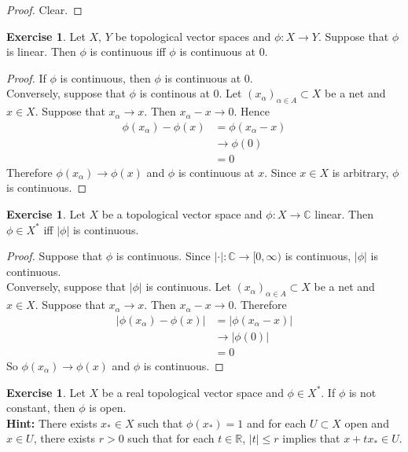 \documentclass[12pt]{amsart}
\theoremstyle{definition}
\newtheorem{ex}[definition]{Exercise}
\newcommand{\al}{\alpha}
\newcommand{\C}{\mathbb{C}}
\newcommand{\R}{\mathbb{R}}
\newcommand{\Rg}{[0,\infty)}
\begin{document}
	\begin{proof}
		Clear.
	\end{proof}

	\begin{ex}
		Let $X$, $Y$ be topological vector spaces and $\phi:X \rightarrow Y$. Suppose that $\phi$ is linear. Then $\phi$ is continuous iff $\phi$ is continuous at $0$.
	\end{ex}
	
	\begin{proof}
		If $\phi$ is continuous, then $\phi$ is continuous at $0$.\\
		Conversely, suppose that $\phi$ is continous at $0$. Let $(x_{\al})_{\al \in A} \subset X$ be a net and $x \in X$. Suppose that $x_{\al} \rightarrow x$. Then $x_{\al} - x \rightarrow 0$. Hence 
		\begin{align*}
			\phi(x_{\al}) - \phi(x) 
			&= \phi(x_{\al} - x) \\
			&\rightarrow \phi(0) \\
			&= 0
		\end{align*}
		Therefore $\phi(x_{\al}) \rightarrow \phi(x)$ and $\phi$ is continuous at $x$. Since $x \in X$ is arbitrary, $\phi$ is continuous. 
	\end{proof}

\begin{ex}
	Let $X$ be a topological vector space and $\phi :X \rightarrow \C$ linear. Then $\phi \in X^*$ iff $|\phi|$ is continuous. 
\end{ex}

\begin{proof}
	Suppose that $\phi$ is continuous. Since  $|\cdot|:\C \rightarrow \Rg$ is continuous, $|\phi|$ is continuous. \\
	Conversely, suppose that $|\phi|$ is continuous. Let $(x_{\al})_{\al \in A} \subset X$ be a net and $x \in X$. Suppose that $x_{\al} \rightarrow x$. Then $x_{\al} - x \rightarrow 0$. Therefore 
	\begin{align*}
		|\phi(x_{\al}) - \phi(x)| 
		&= |\phi(x_{\al} - x)| \\
		& \rightarrow |\phi(0)| \\
		&= 0
	\end{align*} 
	So $\phi(x_{\al}) \rightarrow \phi(x)$ and $\phi$ is continuous.
\end{proof}

	\begin{ex}
		Let $X$ be a real topological vector space and $\phi \in X^*$. If $\phi$ is not constant, then $\phi$ is open. \\
		\textbf{Hint:} There exists $x_* \in X$  such that $\phi(x_*) = 1$ and for each $U \subset X$ open and $x \in U$, there exists $r >0$ such that for each $t \in \R$, $|t| \leq r$ implies that $x + tx_* \in U$. 
	\end{ex}
	
\end{document}
